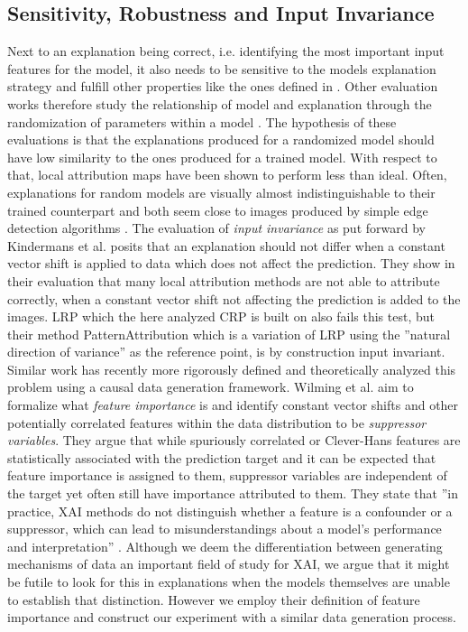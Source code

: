 \subsection{Sensitivity, Robustness and Input Invariance}
Next to an explanation being correct, i.e. identifying the most important input features for the model, it also needs to be sensitive to the models explanation strategy and fulfill other properties like the ones defined in \cite{Nauta2023}.
Other evaluation works therefore study the relationship of model and explanation through the randomization of parameters within a model \cite{Adebayo2018, Sixt2020, MORE}. The hypothesis of these evaluations is that the explanations produced for a randomized model should have low similarity to the ones produced for a trained model. With respect to that, local attribution maps have been shown to perform less than ideal. Often, explanations for random models are visually almost indistinguishable to their trained counterpart and both seem close to images produced by simple edge detection algorithms \cite{Adebayo2018, Clark2023}.
The evaluation of \textit{input invariance} as put forward by Kindermans et al. \cite{Kindermans2019, Kindermans2017} posits that an explanation should not differ when a constant vector shift is applied to data which does not affect the prediction. They show in their evaluation that many local attribution methods are not able to attribute correctly, when a constant vector shift not affecting the prediction is added to the images. LRP which the here analyzed CRP is built on also fails this test, but their method PatternAttribution which is a variation of LRP using the ''natural direction of variance'' as the reference point, is by construction input invariant.
Similar work has recently more rigorously defined and theoretically analyzed this problem \cite{Wilming2023,Wilming2022, Clark2023} using a causal data generation framework. Wilming et al. aim to formalize what \textit{feature importance} is and identify constant vector shifts and other potentially correlated features within the data distribution to be \textit{suppressor variables}.
They argue that while spuriously correlated or Clever-Hans features are statistically associated with the prediction target and it can be expected that feature importance is assigned to them, suppressor variables are independent of the target yet often still have importance attributed to them. They state that ''in practice, XAI methods do not distinguish whether a feature is a confounder or a suppressor, which can lead to misunderstandings about a model's performance and interpretation'' \cite{Wilming2023}. Although we deem the differentiation between generating mechanisms of data an important field of study for XAI, we argue that it might be futile to look for this in explanations when the models themselves are unable to establish that distinction. 
However we employ their definition of feature importance and construct our experiment with a similar data generation process.
 

